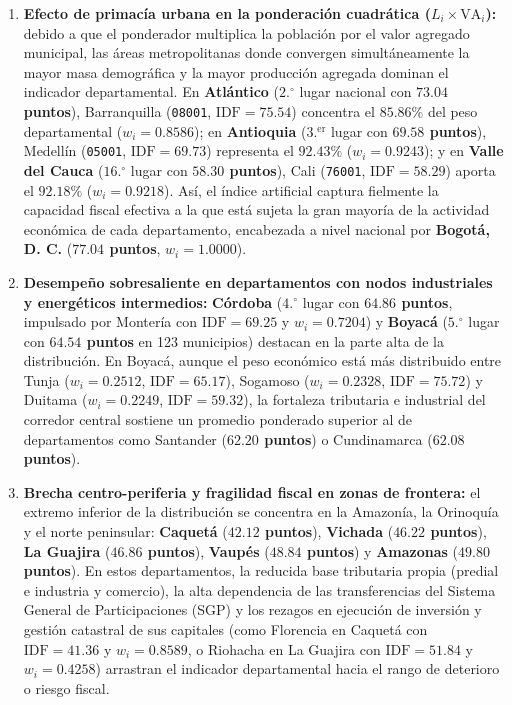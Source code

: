 \documentclass[
  10pt,
  letterpaper,
  DIV=11,
  numbers=noendperiod]{scrartcl}
\providecommand{\tightlist}{%
  \setlength{\itemsep}{0pt}\setlength{\parskip}{0pt}}
\begin{document}
\begin{enumerate}
\def\labelenumi{\arabic{enumi}.}
\tightlist
\item
  \textbf{Efecto de primacía urbana en la ponderación cuadrática
  (\(L_i \times \text{VA}_i\)):} debido a que el ponderador multiplica
  la población por el valor agregado municipal, las áreas metropolitanas
  donde convergen simultáneamente la mayor masa demográfica y la mayor
  producción agregada dominan el indicador departamental. En
  \textbf{Atlántico} (\(2.^{\circ}\) lugar nacional con
  \textbf{\(73.04\) puntos}), Barranquilla (\texttt{08001},
  \(\text{IDF} = 75.54\)) concentra el \(85.86\%\) del peso
  departamental (\(w_i = 0.8586\)); en \textbf{Antioquia}
  (\(3.^{\text{er}}\) lugar con \textbf{\(69.58\) puntos}), Medellín
  (\texttt{05001}, \(\text{IDF} = 69.73\)) representa el \(92.43\%\)
  (\(w_i = 0.9243\)); y en \textbf{Valle del Cauca} (\(16.^{\circ}\)
  lugar con \textbf{\(58.30\) puntos}), Cali (\texttt{76001},
  \(\text{IDF} = 58.29\)) aporta el \(92.18\%\) (\(w_i = 0.9218\)). Así,
  el índice artificial captura fielmente la capacidad fiscal efectiva a
  la que está sujeta la gran mayoría de la actividad económica de cada
  departamento, encabezada a nivel nacional por \textbf{Bogotá, D. C.}
  (\textbf{\(77.04\) puntos}, \(w_i = 1.0000\)).
\item
  \textbf{Desempeño sobresaliente en departamentos con nodos
  industriales y energéticos intermedios:} \textbf{Córdoba}
  (\(4.^{\circ}\) lugar con \textbf{\(64.86\) puntos}, impulsado por
  Montería con \(\text{IDF} = 69.25\) y \(w_i = 0.7204\)) y
  \textbf{Boyacá} (\(5.^{\circ}\) lugar con \textbf{\(64.54\) puntos} en
  123 municipios) destacan en la parte alta de la distribución. En
  Boyacá, aunque el peso económico está más distribuido entre Tunja
  (\(w_i = 0.2512\), \(\text{IDF} = 65.17\)), Sogamoso
  (\(w_i = 0.2328\), \(\text{IDF} = 75.72\)) y Duitama
  (\(w_i = 0.2249\), \(\text{IDF} = 59.32\)), la fortaleza tributaria e
  industrial del corredor central sostiene un promedio ponderado
  superior al de departamentos como Santander (\textbf{\(62.20\)
  puntos}) o Cundinamarca (\textbf{\(62.08\) puntos}).
\item
  \textbf{Brecha centro-periferia y fragilidad fiscal en zonas de
  frontera:} el extremo inferior de la distribución se concentra en la
  Amazonía, la Orinoquía y el norte peninsular: \textbf{Caquetá}
  (\textbf{\(42.12\) puntos}), \textbf{Vichada} (\textbf{\(46.22\)
  puntos}), \textbf{La Guajira} (\textbf{\(46.86\) puntos}),
  \textbf{Vaupés} (\textbf{\(48.84\) puntos}) y \textbf{Amazonas}
  (\textbf{\(49.80\) puntos}). En estos departamentos, la reducida base
  tributaria propia (predial e industria y comercio), la alta
  dependencia de las transferencias del Sistema General de
  Participaciones (SGP) y los rezagos en ejecución de inversión y
  gestión catastral de sus capitales (como Florencia en Caquetá con
  \(\text{IDF} = 41.36\) y \(w_i = 0.8589\), o Riohacha en La Guajira
  con \(\text{IDF} = 51.84\) y \(w_i = 0.4258\)) arrastran el indicador
  departamental hacia el rango de deterioro o riesgo fiscal.
\end{enumerate}
\end{document}
